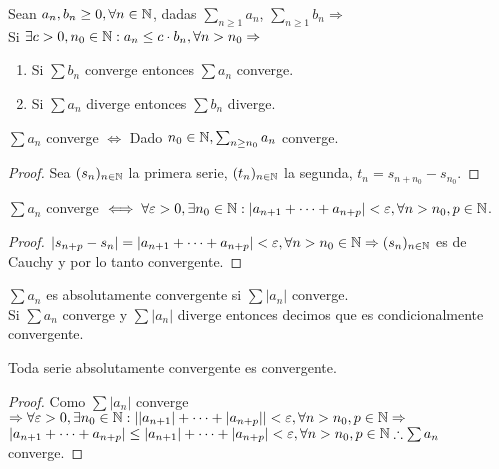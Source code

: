 \begin{corollary}
  Sean $a_n, b_n \geq 0, \forall n \in \mathbb{N}$, dadas $\sum_{n \geq 1} a_n$, $\sum_{n \geq 1} b_n \Rightarrow$ \\
  Si $\exists c > 0, n_0 \in \mathbb{N} : a_n \leq c \cdot b_n, \forall n > n_0 \Rightarrow$ \\
  \begin{enumerate}
    \item Si $\sum b_n$ converge entonces $\sum a_n$ converge.
    \item Si $\sum a_n$ diverge entonces $\sum b_n$ diverge.
  \end{enumerate}

  \begin{note}
    $\sum a_n$ converge $\iff$ Dado $n_0 \in \mathbb{N}, \sum_{n \geq n_0} a_n$ converge.
  \end{note}
  \begin{proof}
    Sea $(s_n)_{n \in \mathbb{N}}$ la primera serie, $(t_n)_{n \in \mathbb{N}}$ la segunda, $t_n = s_{n + n_0} - s_{n_0}$. 
  \end{proof}
\end{corollary}

\begin{theorem}
  $\sum a_n$ converge $\iff \forall \varepsilon > 0, \exists n_0 \in \mathbb{N} : | a_{n+1} + \cdots + a_{n+p} | < \varepsilon, \forall n > n_0, p \in \mathbb{N}$.
  \begin{proof}
    $|s_{n+p} - s_n| = |a_{n+1} + \cdots + a_{n+p}| < \varepsilon, \forall n > n_0 \in \mathbb{N} \Rightarrow (s_n)_{n \in \mathbb{N}}$ es de Cauchy y por lo tanto convergente.
  \end{proof}
\end{theorem}

\begin{definition}
  $\sum a_n$ es absolutamente convergente si $\sum |a_n|$ converge. \\
  Si $\sum a_n$ converge y $\sum |a_n|$ diverge entonces decimos que es condicionalmente convergente.
\end{definition}

\begin{theorem}
  Toda serie absolutamente convergente es convergente.
  \begin{proof}
    Como $\sum |a_n|$ converge $\Rightarrow \forall \varepsilon > 0, \exists n_0 \in \mathbb{N} : | |a_{n+1}| + \cdots + |a_{n+p}|| < \varepsilon, \forall n > n_0, p \in \mathbb{N} \Rightarrow$ \\
    $|a_{n+1} + \cdots + a_{n+p}| \leq |a_{n+1}| + \cdots + |a_{n+p}| < \varepsilon, \forall n > n_0, p \in \mathbb{N} \therefore \sum a_n$ converge.
  \end{proof}
\end{theorem}
